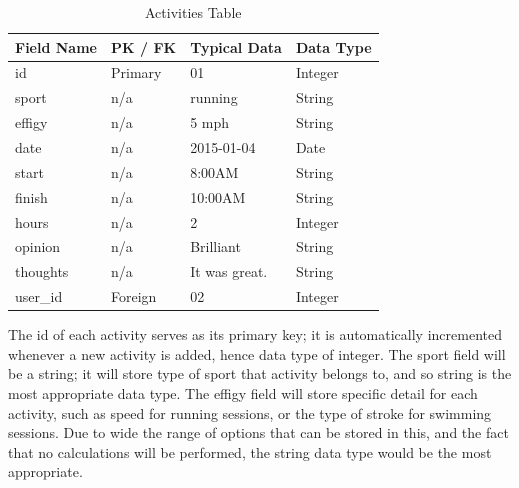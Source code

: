 \documentclass{article}[12pt,a4paper]
\begin{document}
\begin{table}[h]
\begin{tabular}{|l|l|l|l|}
\hline
\textbf{Field Name} & \textbf{PK / FK} & \textbf{Typical Data} & \textbf{Data Type} \\ \hline
id                  & Primary          & 01                    & Integer            \\ \hline
sport               & n/a              & running               & String             \\ \hline
effigy              & n/a              & 5 mph                 & String             \\ \hline
date                & n/a              & 2015-01-04            & Date               \\ \hline
start               & n/a              & 8:00AM                & String             \\ \hline
finish              & n/a              & 10:00AM               & String             \\ \hline
hours               & n/a              & 2                     & Integer            \\ \hline
opinion             & n/a              & Brilliant             & String             \\ \hline
thoughts            & n/a              & It was great.         & String             \\ \hline
user\_id            & Foreign          & 02                    & Integer            \\ \hline
\end{tabular}
\caption{Activities Table}
\end{table}

The id of each activity serves as its primary key; it is automatically incremented whenever a new activity is added, hence data type of integer. The sport field will be a string; it will store type of sport that activity belongs to, and so string is the most appropriate data type. The effigy field will store specific detail for each activity, such as speed for running sessions, or the type of stroke for swimming sessions. Due to wide the range of options that can be stored in this, and the fact that no calculations will be performed, the string data type would be the most appropriate. 
\end{document}
